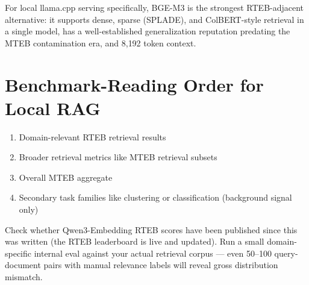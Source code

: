 For local llama.cpp serving specifically, BGE-M3 is the strongest RTEB-adjacent alternative:
it supports dense, sparse (SPLADE), and ColBERT-style retrieval in a single model, has a
well-established generalization reputation predating the MTEB contamination era, and 8{,}192
token context.

\section{Benchmark-Reading Order for Local RAG}

\begin{enumerate}
    \item Domain-relevant RTEB retrieval results
    \item Broader retrieval metrics like MTEB retrieval subsets
    \item Overall MTEB aggregate
    \item Secondary task families like clustering or classification (background signal only)
\end{enumerate}

\begin{notebox}
Check whether Qwen3-Embedding RTEB scores have been published since this was written (the
RTEB leaderboard is live and updated). Run a small domain-specific internal eval against your
actual retrieval corpus --- even 50--100 query-document pairs with manual relevance labels
will reveal gross distribution mismatch.
\end{notebox}
